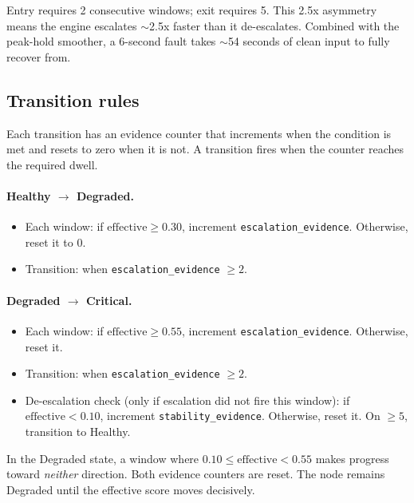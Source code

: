 \documentclass[11pt]{article}
\begin{document}
\begin{keyinsight}
  Entry requires 2 consecutive windows; exit requires 5. This 2.5x asymmetry
  means the engine escalates $\sim$2.5x faster than it de-escalates. Combined
  with the peak-hold smoother, a 6-second fault takes $\sim$54 seconds of
  clean input to fully recover from.
\end{keyinsight}

\subsection{Transition rules}

Each transition has an evidence counter that increments when the condition is
met and resets to zero when it is not. A transition fires when the counter
reaches the required dwell.

\paragraph{Healthy $\rightarrow$ Degraded.}
\begin{itemize}[nosep]
  \item Each window: if $\text{effective} \geq 0.30$, increment
        \texttt{escalation\_evidence}. Otherwise, reset it to 0.
  \item Transition: when \texttt{escalation\_evidence} $\geq 2$.
\end{itemize}

\paragraph{Degraded $\rightarrow$ Critical.}
\begin{itemize}[nosep]
  \item Each window: if $\text{effective} \geq 0.55$, increment
        \texttt{escalation\_evidence}.  Otherwise, reset it.
  \item Transition: when \texttt{escalation\_evidence} $\geq 2$.
  \item De-escalation check (only if escalation did not fire this window):
        if $\text{effective} < 0.10$, increment \texttt{stability\_evidence}.
        Otherwise, reset it. On $\geq 5$, transition to Healthy.
\end{itemize}

\begin{warningbox}
  In the Degraded state, a window where $0.10 \leq \text{effective} < 0.55$
  makes progress toward \emph{neither} direction. Both evidence counters are
  reset. The node remains Degraded until the effective score moves decisively.
\end{warningbox}
\end{document}
